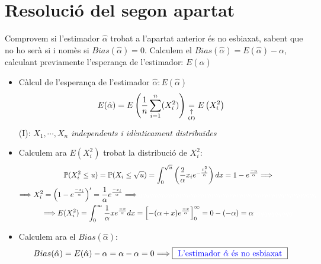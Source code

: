 \documentclass[12pt]{article}
\begin{document}
\section{Resolució del segon apartat}
Comprovem si l'estimador $\hat{\alpha}$ trobat a l'apartat anterior és no esbiaxat, sabent que no ho serà si i nomès si $Bias(\hat{\alpha})=0$. Calculem el $Bias(\hat{\alpha})=E(\hat{\alpha})-\alpha$, calculant previamente l'esperança de l'estimador: $E(\hat{\alpha})$
\begin{itemize}
    \item Càlcul de l'esperança de l'estimador $\hat{\alpha}: E(\hat{\alpha})$
    \begin{multline*}
        E(\hat{\alpha})= E\left(\frac{1}{n}\sum_{i=1}^{n}(X_i^2)\right) \underset{\underset{\textbf{(\textit{I})}}{\uparrow}}{=} E\left(X_i^2 \right) \\
    \end{multline*}
    (I): \textit{$X_1, \cdots , X_n$ independents i idènticament distribuïdes}\\
    
    \item Calculem ara $E(X_i^2)$ trobat la distribució de $X_i^2$:
    \begin{multline}
    \label{esperanza}
        \mathbb{P}(X_i^2\leq u)=\mathbb{P}(X_i \leq \sqrt{u}) = \int_0^{\sqrt{u}} \left( \frac{2}{\alpha}x_i e^{-\frac{x_i^2}{\alpha}} \right) dx = 1 -e^{\frac{-u}{\alpha}} \Longrightarrow \\ \Longrightarrow X_i^2= \left(1- e^{\frac{-x_i}{\alpha}}\right)'
        = \frac{1}{\alpha}e^{\frac{-x_i}{\alpha}} \Longrightarrow \textcolor{white}{qqqqqqqqqqqqqqqqqqqqqqqqqqqqqqqqqqqqqqqqqqqqqqqqqq} \\ \Longrightarrow E(X_i^2)= \int_{0}^{\infty} \frac{1}{\alpha}xe^{\frac{-x}{\alpha}} dx = \left[ -(\alpha+x)e^{\frac{-x}{\alpha}} \right]_{0}^{\infty} = 0-(-\alpha)=\alpha\textcolor{white}{qqqqqqqqqqq}
    \end{multline}
     \item Calculem ara el $Bias(\hat{\alpha})$:
     \begin{multline*}
         Bias(\hat{\alpha})=E(\hat{\alpha})-\alpha=\alpha-\alpha=0 \Longrightarrow  \fcolorbox{black}{white}{ \textcolor{blue}{L'estimador $\hat{\alpha}$ és no esbiaxat} }
     \end{multline*}
\end{itemize}
\newpage
\end{document}
